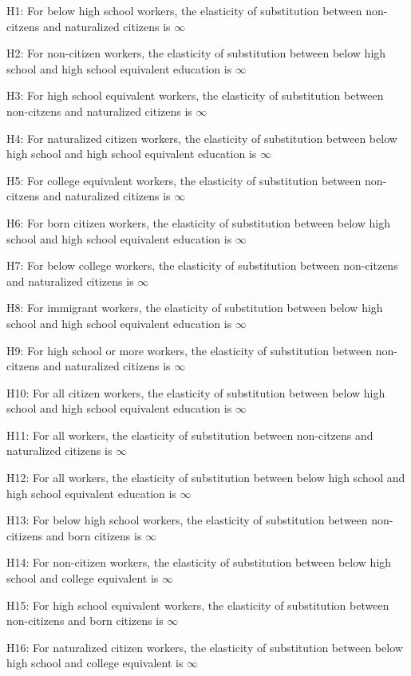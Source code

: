 \documentclass[11pt]{article}
\theoremstyle{definition}
\theoremstyle{remark}
\begin{document}
\tiny{
H1: For below high school workers, the elasticity of substitution between non-citzens and naturalized citizens is $\infty$

H2: For non-citizen workers, the elasticity of substitution between below high school and high school equivalent education is $\infty$

H3: For high school equivalent workers, the elasticity of substitution between non-citzens and naturalized citizens is $\infty$

H4: For naturalized citizen workers, the elasticity of substitution between below high school and high school equivalent education is $\infty$

H5: For college equivalent workers, the elasticity of substitution between non-citzens and naturalized citizens is $\infty$

H6: For born citizen workers, the elasticity of substitution between below high school and high school equivalent education is $\infty$

H7: For below college workers, the elasticity of substitution between non-citzens and naturalized citizens is $\infty$

H8: For immigrant workers, the elasticity of substitution between below high school and high school equivalent education is $\infty$

H9: For high school or more workers, the elasticity of substitution between non-citzens and naturalized citizens is $\infty$

H10: For all citizen workers, the elasticity of substitution between below high school and high school equivalent education is $\infty$

H11: For all workers, the elasticity of substitution between non-citzens and naturalized citizens is $\infty$

H12: For all workers, the elasticity of substitution between below high school and high school equivalent education is $\infty$

H13: For below high school workers, the elasticity of substitution between non-citizens and born citizens is $\infty$

H14: For non-citizen workers, the elasticity of substitution between below high school and college equivalent is $\infty$

H15: For high school equivalent workers, the elasticity of substitution between non-citizens and born citizens is $\infty$

H16: For naturalized citizen workers, the elasticity of substitution between below high school and college equivalent is $\infty$

}
\end{document}
